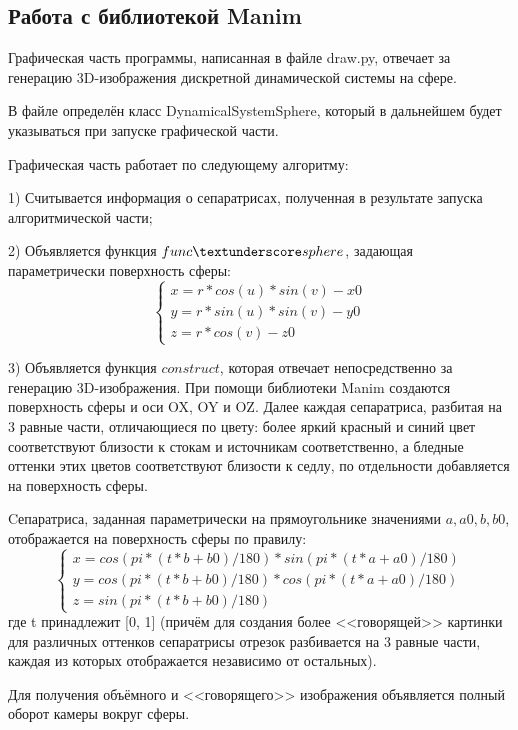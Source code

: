 	\subsection{Работа с библиотекой Manim}
	\hspace{0.5 cm} Графическая часть программы, написанная в файле draw.py, отвечает за генерацию 3D-изображения дискретной динамической системы на сфере.
	\par В файле определён класс DynamicalSystemSphere, который в дальнейшем будет указываться при запуске графической части.
	\par Графическая часть работает по следующему алгоритму:
	\par 1) Считывается информация о сепаратрисах, полученная в результате запуска алгоритмической части;
	\par 2) Объявляется функция $func \textunderscore sphere$, задающая параметрически поверхность сферы:
	$$ \begin{cases}
		x = r * cos(u) * sin(v) - x0\\
		y = r * sin(u) * sin(v) - y0\\
		z = r * cos(v) - z0
	\end{cases} $$
	\par 3) Объявляется функция $construct$, которая отвечает непосредственно за генерацию 3D-изображения. При помощи библиотеки Manim создаются поверхность сферы и оси OX, OY и OZ. Далее каждая сепаратриса, разбитая на 3 равные части, отличающиеся по цвету: более яркий красный и синий цвет соответствуют близости к стокам и источникам соответственно, а бледные оттенки этих цветов соответствуют близости к седлу, по отдельности добавляется на поверхность сферы.
	\par Cепаратриса, заданная параметрически на прямоугольнике значениями $a, a0, b, b0$, отображается на поверхность сферы по правилу:
	$$ \begin{cases}
		x = cos(pi * (t * b + b0) / 180) * sin(pi * (t * a + a0) / 180)\\
		y = cos(pi * (t * b + b0) / 180) * cos(pi * (t * a + a0) / 180)\\
		z = sin(pi * (t * b + b0) / 180)
	\end{cases} $$ где t принадлежит [0, 1] (причём для создания более <<говорящей>> картинки для различных оттенков сепаратрисы отрезок разбивается на 3 равные части, каждая из которых отображается независимо от остальных).
	\par Для получения объёмного и <<говорящего>> изображения объявляется полный оборот камеры вокруг сферы.
